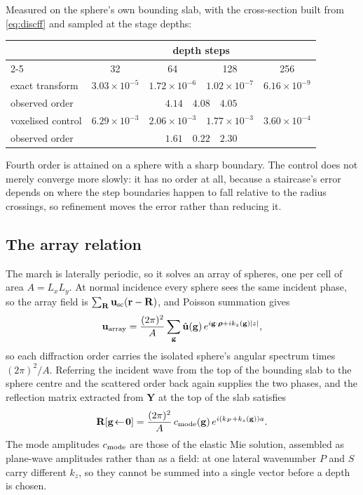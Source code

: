 \documentclass[11pt,a4paper]{article}
\newcommand{\bu}{\mathbf{u}}
\newcommand{\bR}{\mathbf{R}}
\newcommand{\bY}{\mathbf{Y}}
\begin{document}
Measured on the sphere's own bounding slab, with the cross-section built from
\eqref{eq:discff} and sampled at the stage depths:
\begin{center}
\begin{tabular}{@{}lcccc@{}}
\toprule
 & \multicolumn{4}{c}{depth steps} \\
\cmidrule(l){2-5}
 & 32 & 64 & 128 & 256 \\
\midrule
exact transform   & $3.03\times 10^{-5}$ & $1.72\times 10^{-6}$ & $1.02\times 10^{-7}$ & $6.16\times 10^{-9}$ \\
observed order    & \multicolumn{4}{c}{$4.14\quad 4.08\quad 4.05$} \\[2pt]
voxelised control & $6.29\times 10^{-3}$ & $2.06\times 10^{-3}$ & $1.77\times 10^{-3}$ & $3.60\times 10^{-4}$ \\
observed order    & \multicolumn{4}{c}{$1.61\quad 0.22\quad 2.30$} \\
\bottomrule
\end{tabular}
\end{center}
Fourth order is attained on a sphere with a sharp boundary.  The control does
not merely converge more slowly: it has no order at all, because a staircase's
error depends on where the step boundaries happen to fall relative to the radius
crossings, so refinement moves the error rather than reducing it.

\subsection{The array relation}

The march is laterally periodic, so it solves an array of spheres, one per cell
of area $A=L_xL_y$.  At normal incidence every sphere sees the same incident
phase, so the array field is $\sum_{\mathbf{R}}\bu_{\rm sc}(\mathbf{r}-\mathbf{R})$, and Poisson
summation gives
\begin{equation}
  \bu_{\rm array}
    = \frac{(2\pi)^2}{A}\sum_{\mathbf{g}}\hat{\bu}(\mathbf{g})\,
      e^{i\mathbf{g}\cdot\boldsymbol{\rho} + i k_z(\mathbf{g})|z|} ,
  \label{eq:poisson}
\end{equation}
so each diffraction order carries the isolated sphere's angular spectrum times
$(2\pi)^2/A$.  Referring the incident wave from the top of the bounding slab to
the sphere centre and the scattered order back again supplies the two phases,
and the reflection matrix extracted from $\bY$ at the top of the slab satisfies
\begin{equation}
  \bR[\mathbf{g}\!\leftarrow\!\mathbf{0}]
    = \frac{(2\pi)^2}{A}\,c_{\rm mode}(\mathbf{g})\,
      e^{i\left(k_P + k_z(\mathbf{g})\right)a} .
  \label{eq:arrayrel}
\end{equation}
The mode amplitudes $c_{\rm mode}$ are those of the elastic Mie solution,
assembled as plane-wave amplitudes rather than as a field: at one lateral
wavenumber $P$ and $S$ carry different $k_z$, so they cannot be summed into a
single vector before a depth is chosen.
\end{document}
